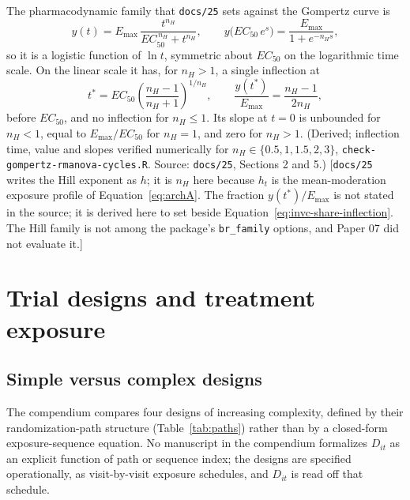 \documentclass[11pt]{article}
\newcommand{\note}[1]{\textcolor{blue!60!black}{\small [#1]}}
\newcommand{\code}[1]{\texttt{#1}}
\begin{document}
The pharmacodynamic family that \code{docs/25} sets against the
Gompertz curve is
\begin{equation}
y(t) = E_{\max}\,\frac{t^{n_H}}{EC_{50}^{\,n_H} + t^{n_H}},
\qquad y\big(EC_{50}\,e^{s}\big) = \frac{E_{\max}}{1 + e^{-n_H s}},
\label{eq:invb-hill}
\end{equation}
so it is a logistic function of $\ln t$, symmetric about $EC_{50}$ on
the logarithmic time scale. On the linear scale it has, for $n_H > 1$,
a single inflection at
\begin{equation}
t^\ast = EC_{50}\left(\frac{n_H - 1}{n_H + 1}\right)^{1/n_H},
\qquad \frac{y(t^\ast)}{E_{\max}} = \frac{n_H - 1}{2n_H},
\label{eq:invb-hill-inflection}
\end{equation}
before $EC_{50}$, and no inflection for $n_H \le 1$. Its slope at
$t = 0$ is unbounded for $n_H < 1$, equal to $E_{\max}/EC_{50}$ for
$n_H = 1$, and zero for $n_H > 1$. (Derived; inflection time, value
and slopes verified numerically for $n_H \in \{0.5, 1, 1.5, 2, 3\}$,
\code{check-gompertz-rmanova-cycles.R}. Source: \code{docs/25}, Sections 2 and 5.)
\note{\code{docs/25} writes the Hill exponent as $h$; it is $n_H$ here
because $h_t$ is the mean-moderation exposure profile of
Equation~\eqref{eq:archA}. The fraction $y(t^\ast)/E_{\max}$ is not
stated in the source; it is derived here to set beside
Equation~\eqref{eq:invc-share-inflection}. The Hill family is not
among the package's \code{br\_family} options, and Paper 07 did not
evaluate it.}

\section{Trial designs and treatment exposure}
\label{sec:designs}

\subsection{Simple versus complex designs}

The compendium compares four designs of increasing complexity, defined
by their randomization-path structure (Table~\ref{tab:paths}) rather
than by a closed-form exposure-sequence equation. No manuscript in the
compendium formalizes $D_{it}$ as an explicit function of path or
sequence index; the designs are specified operationally, as
visit-by-visit exposure schedules, and $D_{it}$ is read off that
schedule.
\end{document}
